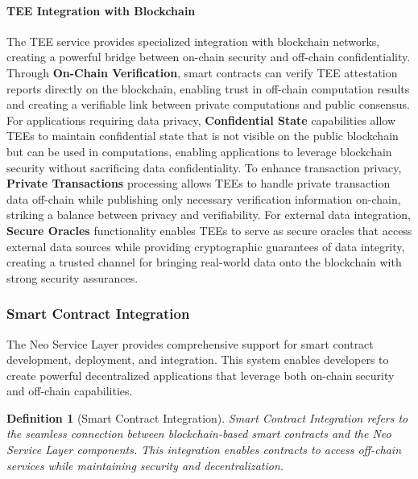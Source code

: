 \documentclass[11pt]{article}
\newtheorem{definition}{Definition}
\begin{document}
\paragraph{TEE Integration with Blockchain}
The TEE service provides specialized integration with blockchain networks, creating a powerful bridge between on-chain security and off-chain confidentiality. Through \textbf{On-Chain Verification}, smart contracts can verify TEE attestation reports directly on the blockchain, enabling trust in off-chain computation results and creating a verifiable link between private computations and public consensus. For applications requiring data privacy, \textbf{Confidential State} capabilities allow TEEs to maintain confidential state that is not visible on the public blockchain but can be used in computations, enabling applications to leverage blockchain security without sacrificing data confidentiality. To enhance transaction privacy, \textbf{Private Transactions} processing allows TEEs to handle private transaction data off-chain while publishing only necessary verification information on-chain, striking a balance between privacy and verifiability. For external data integration, \textbf{Secure Oracles} functionality enables TEEs to serve as secure oracles that access external data sources while providing cryptographic guarantees of data integrity, creating a trusted channel for bringing real-world data onto the blockchain with strong security assurances.

\subsubsection{Smart Contract Integration}
\label{subsubsec:smart-contract}

The Neo Service Layer provides comprehensive support for smart contract development, deployment, and integration. This system enables developers to create powerful decentralized applications that leverage both on-chain security and off-chain capabilities.



\begin{definition}[Smart Contract Integration]
Smart Contract Integration refers to the seamless connection between blockchain-based smart contracts and the Neo Service Layer components. This integration enables contracts to access off-chain services while maintaining security and decentralization.
\end{definition}
\end{document}
